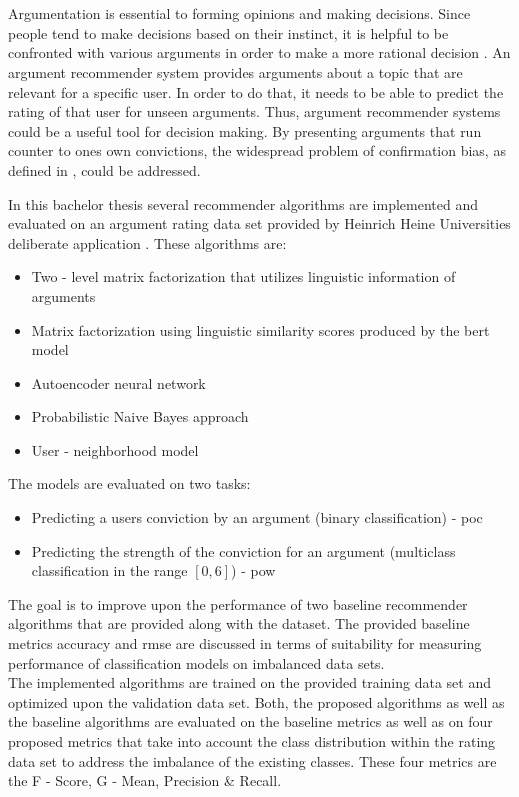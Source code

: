 \section*{}

Argumentation is essential to forming opinions and making decisions. Since people tend to make decisions based on their instinct, it is helpful to be confronted with various arguments in order to make a more rational decision \cite{klein2017sources}. An argument recommender system provides arguments about a topic that are relevant for a specific user. In order to do that, it needs to be able to predict the rating of that user for unseen arguments. Thus, argument recommender systems could be a useful tool for decision making. By presenting arguments that run counter to ones own convictions, the widespread problem of confirmation bias, as defined in \cite{nickerson1998confirmation}, could be addressed. 

In this bachelor thesis several recommender algorithms are implemented and evaluated on an argument rating data set provided by Heinrich Heine Universities deliberate application \cite{brenneis2020deliberate}. These algorithms are:
\begin{itemize}
    \item Two - level matrix factorization that utilizes linguistic information of arguments
    \item Matrix factorization using linguistic similarity scores produced by the \acrfull{bert} model
    \item Autoencoder neural network
    \item Probabilistic Naive Bayes approach
    \item User - neighborhood model
\end{itemize}
The models are evaluated on two tasks:
\begin{itemize}
    \item Predicting a users conviction by an argument (binary classification) - \acrfull{poc}
    \item Predicting the strength of the conviction for an argument (multiclass classification in the range $[0,6]$) - \acrfull{pow}
\end{itemize}

The goal is to improve upon the performance of two baseline recommender algorithms that are provided along with the dataset.
The provided baseline metrics accuracy and \acrfull{rmse} are discussed in terms of suitability for measuring performance of classification models on imbalanced data sets.\\
The implemented algorithms are trained on the provided training data set and optimized upon the validation data set. Both, the proposed algorithms as well as the baseline algorithms are evaluated on the baseline metrics as well as on four proposed metrics that take into account the class distribution within the rating data set to address the imbalance of the existing classes. These four metrics are the F - Score, G - Mean, Precision \& Recall. 

